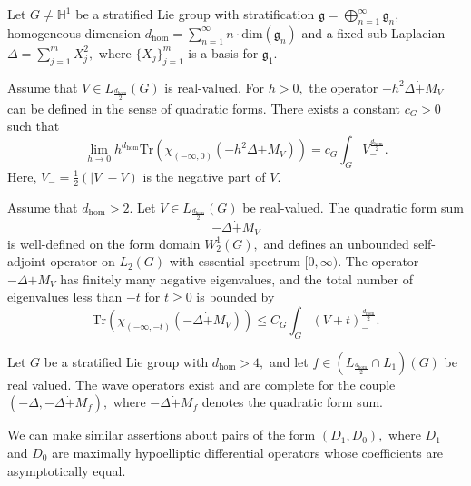 \documentclass{beamer}
\numberwithin{equation}{section}
\theoremstyle{plain}
\theoremstyle{plain}
\theoremstyle{definition}
\theoremstyle{plain}
\theoremstyle{plain}
\theoremstyle{definition}
\newcommand{\Tr}{\mathrm{Tr}}
\newcommand{\gf}{\mathfrak{g}}
\begin{document}
\begin{frame}
\begin{corollary}\label{semi-classical corollary}
    Let $G\neq\mathbb{H}^1$ be a stratified Lie group with stratification $\gf = \bigoplus_{n=1}^\infty \gf_n,$ homogeneous dimension $d_{\hom} = \sum_{n=1}^\infty n\cdot \mathrm{dim}(\gf_n)$
    and a fixed sub-Laplacian $\Delta = \sum_{j=1}^m X_j^2,$ where $\{X_j\}_{j=1}^m$ is a basis for $\gf_1.$

    Assume that $V\in L_{\frac{d_{\hom}}{2}}(G)$ is real-valued. For $h>0,$ the operator $-h^2\Delta\dot{+}M_V$ can be defined in the sense of quadratic forms.
    There exists a constant $c_{G}>0$ such that
    \[
        \lim_{h\to 0} h^{d_{\hom}}\Tr(\chi_{(-\infty,0)}(-h^2\Delta\dot{+}M_V)) = c_{G}\int_{G} V_-^{\frac{d_{\hom}}{2}}.
    \]
    Here, $V_- = \frac{1}{2}(|V|-V)$ is the negative part of $V.$
\end{corollary}
\end{frame}


\begin{frame}
\begin{theorem}\label{CLR_theorem}
    Assume that $d_{\hom}>2.$ Let $V \in L_{\frac{d_{\hom}}{2}}(G)$ be real-valued. The quadratic form sum
    \[
        -\Delta\dot{+}M_V
    \]
    is well-defined on the form domain $W^1_2(G),$ and defines an unbounded self-adjoint operator on $L_2(G)$ with essential spectrum $[0,\infty).$ The operator $-\Delta\dot{+}M_V$ has finitely many negative eigenvalues, and the total number of eigenvalues less than $-t$ for $t\geq 0$ is bounded by
    \[
        \Tr(\chi_{(-\infty,-t)}(-\Delta\dot{+}M_V)) \leq C_{G}\int_{G} (V+t)_-^{\frac{d_{\hom}}{2}}.
    \]
\end{theorem}
\end{frame}

\begin{frame}

  \begin{theorem}
  Let $G$ be a stratified Lie group with $d_{\hom}>4,$ and let $f\in(L_{\frac{d_{\hom}}{2}}\cap L_1)(G)$ be real valued. The wave operators exist and are complete for the couple $(-\Delta,-\Delta\dot{+}M_f),$ where $-\Delta\dot{+}M_f$ denotes the quadratic form sum.
  \end{theorem}
  We can make similar assertions about pairs of the form $(D_1,D_0),$ where $D_1$ and $D_0$ are maximally hypoelliptic differential operators whose coefficients are asymptotically equal.
\end{frame}


\begin{frame}
\end{frame}
\end{document}
